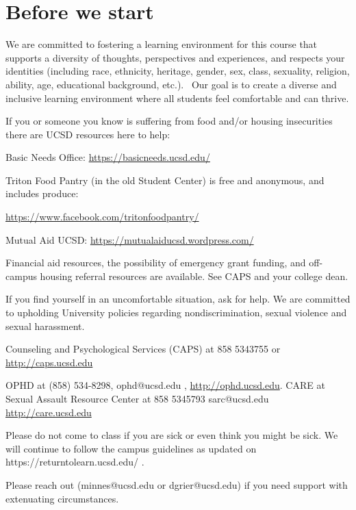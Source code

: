 \documentclass[12pt, oneside]{article}
\begin{document}
\begin{flushright}
\end{flushright} 
\section*{Before we start}

We are committed to fostering a learning environment for this course that supports a diversity of thoughts, 
perspectives and experiences, and respects your identities (including race, ethnicity, heritage, gender, sex, 
class, sexuality, religion, ability, age, educational background, etc.).  
Our goal is to create a diverse and inclusive learning environment where all students feel comfortable and can thrive. 

If you or someone you know is suffering from food and/or housing insecurities 
there are UCSD resources here to help:

Basic Needs Office: \href{https://basicneeds.ucsd.edu/}{https://basicneeds.ucsd.edu/}

Triton Food Pantry (in the old Student Center)
is free and anonymous, and includes produce: 

\href{https://www.facebook.com/tritonfoodpantry/}{https://www.facebook.com/tritonfoodpantry/}

Mutual Aid UCSD: \href{https://mutualaiducsd.wordpress.com/}{https://mutualaiducsd.wordpress.com/}

Financial aid resources, the possibility of emergency grant funding, and off-campus housing referral 
resources are available. See CAPS and your college dean.

If you find yourself in an uncomfortable situation, ask for help. 
We are committed to upholding University policies regarding nondiscrimination, sexual violence and sexual harassment.

Counseling and Psychological Services (CAPS) at 858 5343755 or \href{http://caps.ucsd.edu}{http://caps.ucsd.edu}


OPHD at (858) 534-8298, ophd@ucsd.edu , \href{http://ophd.ucsd.edu}{http://ophd.ucsd.edu}. 
CARE at Sexual Assault Resource Center at 858 5345793 sarc@ucsd.edu \href{http://care.ucsd.edu}{http://care.ucsd.edu}


Please do not come to class if you are sick or even think you might be sick.
We will continue to follow the campus guidelines as updated on https://returntolearn.ucsd.edu/ .

Please reach out (minnes@ucsd.edu or dgrier@ucsd.edu) if you need support with extenuating circumstances.
\end{document}

